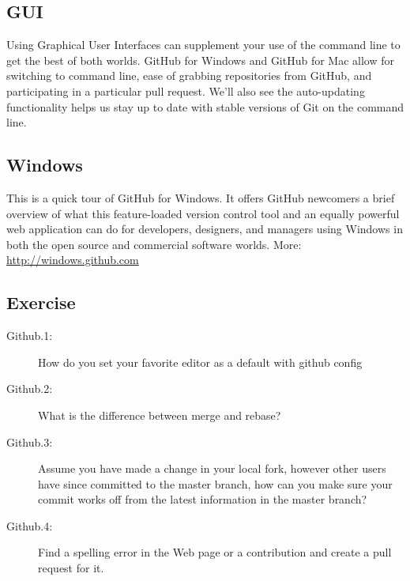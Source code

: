 
\subsection{GUI}\label{gui}

Using Graphical User Interfaces can supplement your use of the command
line to get the best of both worlds. GitHub for Windows and GitHub for
Mac allow for switching to command line, ease of grabbing repositories
from GitHub, and participating in a particular pull request. We'll also
see the auto-updating functionality helps us stay up to date with stable
versions of Git on the command line.


\subsection{Windows}\label{windows}

This is a quick tour of GitHub for Windows. It offers GitHub newcomers a
brief overview of what this feature-loaded version control tool and an
equally powerful web application can do for developers, designers, and
managers using Windows in both the open source and commercial software
worlds. More: \url{http://windows.github.com}


\subsection{Exercise}\label{exercise}

\begin{description}
\item[Github.1:]
How do you set your favorite editor as a default with github config
\item[Github.2:]
What is the difference between merge and rebase?
\item[Github.3:]
Assume you have made a change in your local fork, however other users
have since committed to the master branch, how can you make sure your
commit works off from the latest information in the master branch?
\item[Github.4:]
Find a spelling error in the Web page or a contribution and create a
pull request for it.
\end{description}
